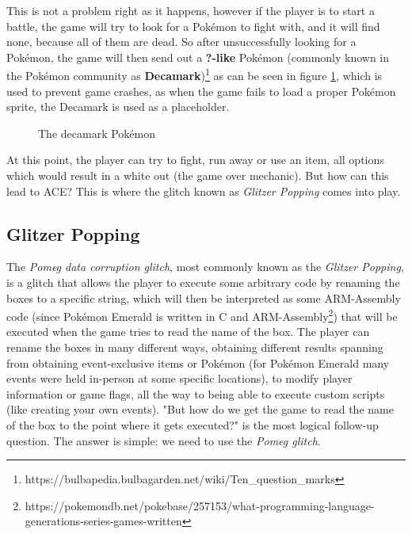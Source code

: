 \documentclass[a4paper]{usiinfbachelorproject}
\begin{document}
This is not a problem right as it happens, however if the player is to start a battle, the game will try to look for a Pokémon to fight with, and it will find none, because all of them are dead. So after unsuccessfully looking for a Pokémon, the game will then send out a \textbf{?-like} Pokémon (commonly known in the Pokémon community as \textbf{Decamark})\footnote{https://bulbapedia.bulbagarden.net/wiki/Ten\_question\_marks} as can be seen in figure \ref{fig:decamark}, which is used to prevent game crashes, as when the game fails to load a proper Pokémon sprite, the Decamark is used as a placeholder.

\begin{figure}[h!]
	\caption{The decamark Pokémon}\label{fig:decamark}
\end{figure}

At this point, the player can try to fight, run away or use an item, all options which would result in a white out (the game over mechanic). But how can this lead to ACE? This is where the glitch known as \textit{Glitzer Popping} comes into play.

\subsection{Glitzer Popping}
\label{sec:glitzer_popping}
The \textit{Pomeg data corruption glitch}, most commonly known as the \textit{Glitzer Popping}, is a glitch that allows the player to execute some arbitrary code by renaming the boxes to a specific string, which will then be interpreted as some ARM-Assembly code (since Pokémon Emerald is written in C and ARM-Assembly\footnote{https://pokemondb.net/pokebase/257153/what-programming-language-generations-series-games-written}) that will be executed when the game tries to read the name of the box. The player can rename the boxes in many different ways, obtaining different results spanning from obtaining event-exclusive items or Pokémon (for Pokémon Emerald many events were held in-person at some specific locations), to modify player information or game flags, all the way to being able to execute custom scripts (like creating your own events). "But how do we get the game to read the name of the box to the point where it gets executed?" is the most logical follow-up question. The answer is simple: we need to use the \textit{Pomeg glitch}.
\end{document}

